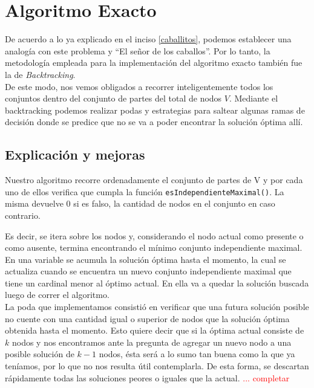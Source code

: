 \section{Algoritmo Exacto}
De acuerdo a lo ya explicado en el inciso \ref{caballitos}, podemos establecer una analog\'ia con este problema y ``El se\~nor de los caballos''. Por lo tanto, la metodolog\'ia empleada para la implementaci\'on del algoritmo exacto tambi\'en fue la de \emph{Backtracking}.\\

De este modo, nos vemos obligados a recorrer inteligentemente todos los conjuntos dentro del conjunto de partes del total de nodos $V$. Mediante el backtracking podemos realizar podas y estrategias para saltear algunas ramas de decisi\'on donde se predice que no se va a poder encontrar la soluci\'on \'optima all\'i.


\subsection{Explicaci\'on y mejoras}

Nuestro algoritmo recorre ordenadamente el conjunto de partes de V y por cada uno de ellos verifica que cumpla la funci\'on  \texttt{esIndependienteMaximal()}. La misma devuelve 0 si es falso, la cantidad de nodos en el conjunto en caso contrario.

Es decir, se itera sobre los nodos y, considerando el nodo actual como presente o como ausente, termina encontrando el m\'inimo conjunto independiente maximal.\\

En una variable se acumula la soluci\'on \'optima hasta el momento, la cual se actualiza cuando se encuentra un nuevo conjunto independiente maximal que tiene un cardinal menor al \'optimo actual. 
En ella va a quedar la soluci\'on buscada luego de correr el algoritmo.\\

La poda que implementamos consisti\'o en verificar que una futura soluci\'on posible no cuente con una cantidad igual o superior de nodos que la soluci\'on \'optima obtenida hasta el momento. 
Esto quiere decir que si la \'optima actual consiste de $k$ nodos y nos encontramos ante la pregunta de agregar un nuevo nodo a una posible soluci\'on de $k - 1$ nodos, \'esta ser\'a a lo sumo 
tan buena como la que ya ten\'iamos, por lo que no nos resulta \'util contemplarla. De esta forma, se descartan r\'apidamente todas las soluciones peores o iguales que la actual.
\textcolor{red}{... completar}

